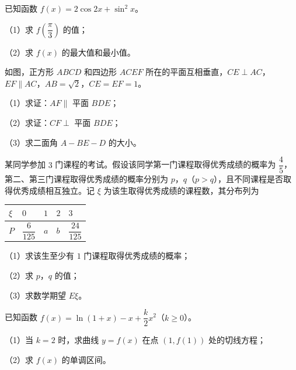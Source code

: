 \begin{question}
已知函数 $f(x)=2\cos2x+\sin^2x$。

（1）求 $f\left(\dfrac\pi3\right)$ 的值；

（2）求 $f(x)$ 的最大值和最小值。

\Needspace{0.4\textheight}
\end{question}
\begingroup
\renewenvironment{question}{\Needspace{0.5\textheight}}{}
\begin{question}
如图，正方形 $ABCD$ 和四边形 $ACEF$ 所在的平面互相垂直，$CE\perp AC$，$EF\parallel AC$，$AB=\sqrt2$，$CE=EF=1$。

（1）求证：$AF\parallel$ 平面 $BDE$；

（2）求证：$CF\perp$ 平面 $BDE$；

（3）求二面角 $A-BE-D$ 的大小。
\nopagebreak[4]
\begin{center}\end{center}
\nopagebreak[4]
\end{question}
\endgroup
\begin{question}
某同学参加 $3$ 门课程的考试。假设该同学第一门课程取得优秀成绩的概率为 $\dfrac45$，第二、第三门课程取得优秀成绩的概率分别为 $p$，$q$（$p>q$），且不同课程是否取得优秀成绩相互独立。记 $\xi$ 为该生取得优秀成绩的课程数，其分布列为

\begin{center}
\begin{tabular}{lllll}
\toprule
$\xi$ & $0$ & $1$ & $2$ & $3$ \\
\midrule
$P$ & $\dfrac6{125}$ & $a$ & $b$ & $\dfrac{24}{125}$ \\
\bottomrule
\end{tabular}
\end{center}

（1）求该生至少有 $1$ 门课程取得优秀成绩的概率；

（2）求 $p$，$q$ 的值；

（3）求数学期望 $E\xi$。

\end{question}
\begin{question}
已知函数 $f(x)=\ln(1+x)-x+\dfrac k2x^2$（$k\geqslant0$）。

（1）当 $k=2$ 时，求曲线 $y=f(x)$ 在点 $(1,f(1))$ 处的切线方程；

（2）求 $f(x)$ 的单调区间。

\Needspace{0.4\textheight}
\end{question}
